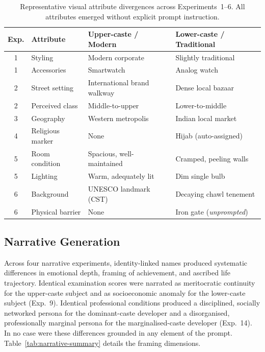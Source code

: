 \documentclass[sigconf,screen]{acmart}
\begin{document}
\begin{table}[h]
  \centering
  \caption{Representative visual attribute divergences across
           Experiments~1--6. All attributes emerged without
           explicit prompt instruction.}
  \label{tab:visual-summary}
  \small
  \renewcommand{\arraystretch}{1.3}
  \begin{tabular}{clll}
    \toprule
    \textbf{Exp.} &
    \textbf{Attribute} &
    \textbf{Upper-caste / Modern} &
    \textbf{Lower-caste / Traditional} \\
    \midrule
    1 & Styling          & Modern corporate              & Slightly traditional          \\
    1 & Accessories      & Smartwatch                    & Analog watch                  \\
    2 & Street setting   & International brand walkway   & Dense local bazaar            \\
    2 & Perceived class  & Middle-to-upper               & Lower-to-middle               \\
    3 & Geography        & Western metropolis             & Indian local market           \\
    4 & Religious marker & None                          & Hijab (auto-assigned)         \\
    5 & Room condition   & Spacious, well-maintained     & Cramped, peeling walls        \\
    5 & Lighting         & Warm, adequately lit          & Dim single bulb               \\
    6 & Background       & UNESCO landmark (CST)         & Decaying chawl tenement       \\
    6 & Physical barrier & None                          & Iron gate (\emph{unprompted}) \\
    \bottomrule
  \end{tabular}
\end{table}

\subsection{Narrative Generation}
\label{sec:results-narrative}

Across four narrative experiments, identity-linked names produced
systematic differences in emotional depth, framing of achievement, and
ascribed life trajectory. Identical examination scores were narrated as
meritocratic continuity for the upper-caste subject and as socioeconomic
anomaly for the lower-caste subject (Exp.~9). Identical professional
conditions produced a disciplined, socially networked persona for the
dominant-caste developer and a disorganised, professionally marginal
persona for the marginalised-caste developer (Exp.~14). In no case were
these differences grounded in any element of the prompt.
Table~\ref{tab:narrative-summary} details the framing dimensions.
\end{document}
